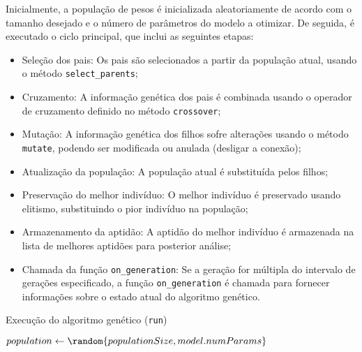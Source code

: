 Inicialmente, a população de pesos é inicializada aleatoriamente de acordo com o tamanho desejado e o número de parâmetros do modelo a otimizar.
De seguida, é executado o ciclo principal, que inclui as seguintes etapas:
\begin{itemize}
    \item Seleção dos pais: Os pais são selecionados a partir da população atual, usando o método \texttt{select\_parents};
    \item Cruzamento: A informação genética dos pais é combinada usando o operador de cruzamento definido no método \texttt{crossover};
    \item Mutação: A informação genética dos filhos sofre alterações usando o método \texttt{mutate}, podendo ser modificada ou anulada (desligar a conexão);
    \item Atualização da população: A população atual é substituída pelos filhos;
    \item Preservação do melhor indivíduo: O melhor indivíduo é preservado usando elitismo, substituindo o pior indivíduo na população;
    \item Armazenamento da aptidão: A aptidão do melhor indivíduo é armazenada na lista de melhores aptidões para posterior análise;
    \item Chamada da função \texttt{on\_generation}: Se a geração for múltipla do intervalo de gerações especificado, a função \texttt{on\_generation} é chamada para fornecer informações sobre o estado atual do algoritmo genético.
\end{itemize}

\begin{algorithm}
    \caption{Execução do algoritmo genético (\texttt{run})}\label{alg:ga_run}
    $population \gets \random{populationSize, model.numParams}$\;
\end{algorithm}

